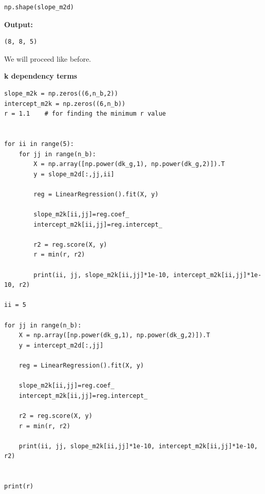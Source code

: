 \documentclass{article}
\begin{document}
\begin{lstlisting}
np.shape(slope_m2d)\end{lstlisting}

\textbf{Output:}\begin{verbatim}
(8, 8, 5)
\end{verbatim}

We will proceed like before.

\textbf{k dependency terms}

\begin{lstlisting}
slope_m2k = np.zeros((6,n_b,2))
intercept_m2k = np.zeros((6,n_b))
r = 1.1    # for finding the minimum r value


for ii in range(5):
    for jj in range(n_b):
        X = np.array([np.power(dk_g,1), np.power(dk_g,2)]).T
        y = slope_m2d[:,jj,ii]

        reg = LinearRegression().fit(X, y)

        slope_m2k[ii,jj]=reg.coef_
        intercept_m2k[ii,jj]=reg.intercept_

        r2 = reg.score(X, y)
        r = min(r, r2)

        print(ii, jj, slope_m2k[ii,jj]*1e-10, intercept_m2k[ii,jj]*1e-10, r2)

ii = 5

for jj in range(n_b):
    X = np.array([np.power(dk_g,1), np.power(dk_g,2)]).T
    y = intercept_m2d[:,jj]

    reg = LinearRegression().fit(X, y)

    slope_m2k[ii,jj]=reg.coef_
    intercept_m2k[ii,jj]=reg.intercept_

    r2 = reg.score(X, y)
    r = min(r, r2)

    print(ii, jj, slope_m2k[ii,jj]*1e-10, intercept_m2k[ii,jj]*1e-10, r2)


print(r)\end{lstlisting}
\end{document}
